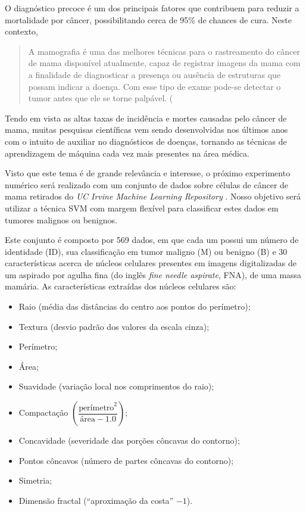 \documentclass[12pt,a4paper]{scrartcl}
\theoremstyle{definition}%
\begin{document}
O diagnóstico precoce é um dos principais fatores que contribuem para
reduzir a mortalidade por câncer, possibilitando cerca de 95\% de
chances de cura. Neste contexto, 
\begin{quote}
{\flushright A mamografia é uma das melhores
técnicas para o rastreamento do câncer de mama disponível atualmente,
capaz de registrar imagens da mama com a finalidade de diagnosticar a
presença ou ausência de estruturas que possam indicar a doença. Com esse
tipo de exame pode-se detectar o tumor antes que ele se torne palpável. (\textcite[p. 229, 2019]{Silva&Leal&Lima}}   
\end{quote}

Tendo em vista as altas taxas
de incidência e mortes causadas pelo câncer de mama, muitas pesquisas
científicas vem sendo desenvolvidas nos últimos anos com o intuito de
auxiliar no diagnósticos de doenças, tornando as técnicas de
aprendizagem de máquina cada vez mais presentes na área médica.

Visto que este tema é de grande relevância e interesse, o próximo experimento numérico será realizado com um conjunto de dados sobre células de câncer de mama retirados do \emph{UC Irvine Machine Learning
Repository} \cite{Dua:2019}. Nosso objetivo será utilizar a técnica SVM com margem
flexível para classificar estes dados em tumores malignos ou benignos.

Este conjunto é composto por 569 dados, em que cada um possui um número
de identidade (ID), sua classificação em tumor maligno (M) ou benigno
(B) e 30 características acerca de núcleos celulares presentes em
imagens digitalizadas de um aspirado por agulha fina (do inglês
\emph{fine needle aspirate}, FNA), de uma massa mamária. As
características extraídas dos núcleos celulares são:

\begin{itemize}
\item
  Raio (média das distâncias do centro aos pontos do perímetro);
\item
  Textura (desvio padrão dos valores da escala cinza);
\item
  Perímetro;
\item
  Área;
\item
  Suavidade (variação local nos comprimentos do raio);
\item
  Compactação $\left( \dfrac{\text{perímetro}^{2}}{\text{área} - 1.0} \right) $;
\item
  Concavidade (severidade das porções côncavas do contorno);
\item
  Pontos côncavos (número de partes côncavas do contorno);
\item
  Simetria;
\item
  Dimensão fractal (``aproximação da costa'' $- 1$).
\end{itemize}
\end{document}
